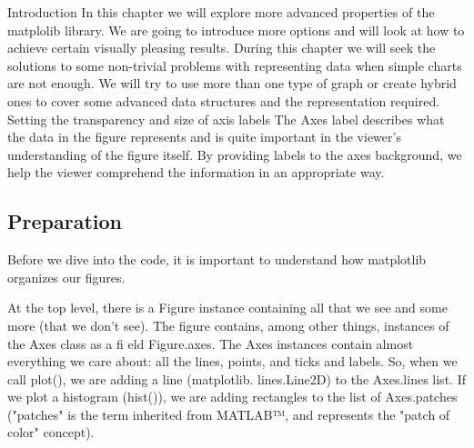 Introduction
In this chapter we will explore more advanced properties of the matplolib library. We are going
to introduce more options and will look at how to achieve certain visually pleasing results.
During this chapter we will seek the solutions to some non-trivial problems with representing
data when simple charts are not enough. We will try to use more than one type of graph or
create hybrid ones to cover some advanced data structures and the representation required.
Setting the transparency and size of
axis labels
The Axes label describes what the data in the figure represents and is quite important in
the viewer's understanding of the figure itself. By providing labels to the axes background,
we help the viewer comprehend the information in an appropriate way.

\subsection{Preparation}
Before we dive into the code, it is important to understand how matplotlib organizes
our figures.

At the top level, there is a Figure instance containing all that we see and some more (that
we don't see). The figure contains, among other things, instances of the Axes class as a fi eld
Figure.axes. The Axes instances contain almost everything we care about: all the lines,
points, and ticks and labels. So, when we call plot(), we are adding a line (matplotlib.
lines.Line2D) to the Axes.lines list. If we plot a histogram (hist()), we are adding
rectangles to the list of Axes.patches ("patches" is the term inherited from MATLAB™,
and represents the "patch of color" concept).

